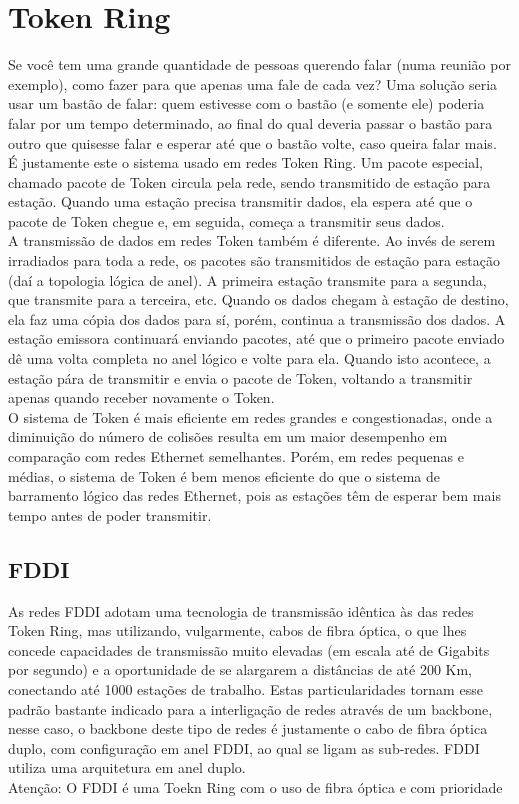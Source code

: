 \documentclass{article}
\begin{document}
\section{Token Ring}
Se você tem uma grande quantidade de pessoas querendo falar (numa reunião por
exemplo), como fazer para que apenas uma fale de cada vez? Uma solução seria
usar um bastão de falar: quem estivesse com o bastão (e somente ele) poderia
falar por um tempo determinado, ao final do qual deveria passar o bastão para
outro que quisesse falar e esperar até que o bastão volte, caso queira falar
mais.\\ É justamente este o sistema usado em redes Token Ring. Um pacote especial,
chamado pacote de Token circula pela rede, sendo transmitido de estação para
estação. Quando uma estação precisa transmitir dados, ela espera até que o
pacote de Token chegue e, em seguida, começa a transmitir seus dados.\\ A transmissão de dados em redes Token também é diferente. Ao invés de serem
irradiados para toda a rede, os pacotes são transmitidos de estação para estação
(daí a topologia lógica de anel). A primeira estação transmite para a segunda,
que transmite para a terceira, etc. Quando os dados chegam à estação de destino,
ela faz uma cópia dos dados para sí, porém, continua a transmissão dos dados. A
estação emissora continuará enviando pacotes, até que o primeiro pacote enviado
dê uma volta completa no anel lógico e volte para ela. Quando isto acontece, a
estação pára de transmitir e envia o pacote de Token, voltando a transmitir
apenas quando receber novamente o Token.\\ O sistema de Token é mais eficiente em redes grandes e congestionadas, onde a
diminuição do número de colisões resulta em um maior desempenho em comparação
com redes Ethernet semelhantes. Porém, em redes pequenas e médias, o sistema de
Token é bem menos eficiente do que o sistema de barramento lógico das redes
Ethernet, pois as estações têm de esperar bem mais tempo antes de poder
transmitir.

\subsection{FDDI}

As redes FDDI adotam uma tecnologia de transmissão idêntica às das redes Token
Ring, mas utilizando, vulgarmente, cabos de fibra óptica, o que lhes concede
capacidades de transmissão muito elevadas (em escala até de Gigabits por
segundo) e a oportunidade de se alargarem a distâncias de até 200 Km, conectando
até 1000 estações de trabalho. Estas particularidades tornam esse padrão
bastante indicado para a interligação de redes através de um backbone, nesse
caso, o backbone deste tipo de redes é justamente o cabo de fibra óptica duplo,
com configuração em anel FDDI, ao qual se ligam as sub-redes. FDDI utiliza uma
arquitetura em anel duplo. \\Atenção: O FDDI é uma Toekn Ring com o uso de fibra óptica e com
prioridade
\end{document}
